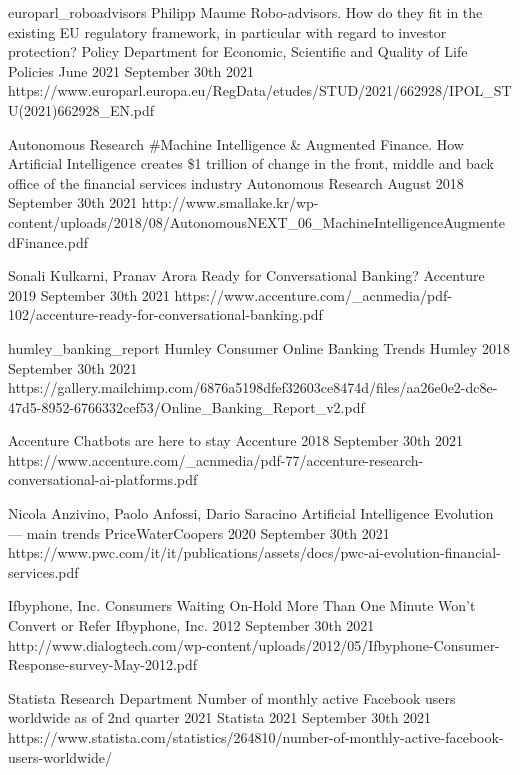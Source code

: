 \begin{thebibliography}{100}
\onlinebibitem
{europarl_roboadvisors}
{Philipp Maume}
{Robo-advisors. How do they fit in the existing EU regulatory framework, in particular with regard to investor protection?}
{Policy Department for Economic, Scientific and Quality of Life Policies}
{June 2021}
{September 30th 2021}
{https://www.europarl.europa.eu/RegData/etudes/STUD/2021/662928/IPOL\_STU(2021)662928\_EN.pdf}

{Autonomous Research}
{\#Machine Intelligence \& Augmented Finance. How Artificial Intelligence creates \$1 trillion of change in the front, middle and back office of the financial services industry}
{Autonomous Research}
{August 2018}
{September 30th 2021}
{http://www.smallake.kr/wp-content/uploads/2018/08/AutonomousNEXT\_06\_MachineIntelligenceAugmentedFinance.pdf}

{Sonali Kulkarni, Pranav Arora}
{Ready for Conversational Banking?}
{Accenture}
{2019}
{September 30th 2021}
{https://www.accenture.com/\_acnmedia/pdf-102/accenture-ready-for-conversational-banking.pdf}

\onlinebibitem
{humley_banking_report}
{Humley}
{Consumer Online Banking Trends}
{Humley}
{2018}
{September 30th 2021}
{https://gallery.mailchimp.com/6876a5198dfef32603ce8474d/files/aa26e0e2-dc8e-47d5-8952-6766332cef53/Online\_Banking\_Report\_v2.pdf}

{Accenture}
{Chatbots are here to stay}
{Accenture}
{2018}
{September 30th 2021}
{https://www.accenture.com/\_acnmedia/pdf-77/accenture-research-conversational-ai-platforms.pdf}

{Nicola Anzivino, Paolo Anfossi, Dario Saracino}
{Artificial Intelligence Evolution — main trends}
{PriceWaterCoopers}
{2020}
{September 30th 2021}
{https://www.pwc.com/it/it/publications/assets/docs/pwc-ai-evolution-financial-services.pdf}

{Ifbyphone, Inc.}
{Consumers Waiting On-Hold More Than One Minute Won’t Convert or Refer}
{Ifbyphone, Inc.}
{2012}
{September 30th 2021}
{http://www.dialogtech.com/wp-content/uploads/2012/05/Ifbyphone-Consumer-Response-survey-May-2012.pdf}

{Statista Research Department}
{Number of monthly active Facebook users worldwide as of 2nd quarter 2021}
{Statista}
{2021}
{September 30th 2021}
{https://www.statista.com/statistics/264810/number-of-monthly-active-facebook-users-worldwide/}


\end{thebibliography}
